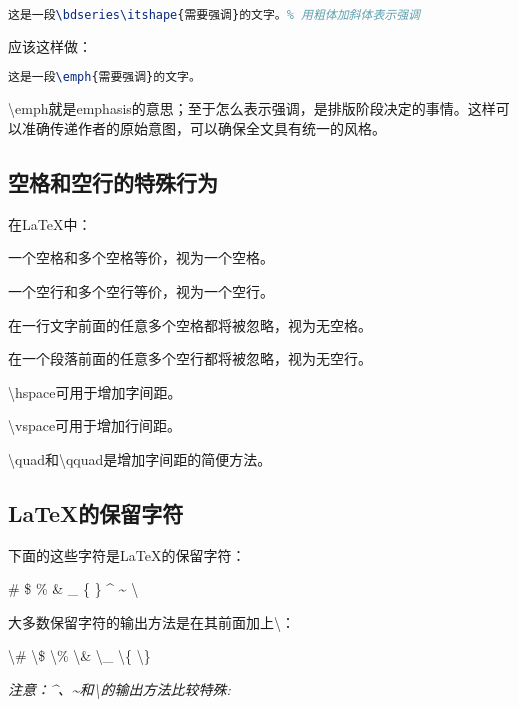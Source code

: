 \begin{lstlisting}[language=TeX]
这是一段\bdseries\itshape{需要强调}的文字。% 用粗体加斜体表示强调
\end{lstlisting}

应该这样做：

\begin{lstlisting}[language=TeX]
这是一段\emph{需要强调}的文字。
\end{lstlisting}

\textbackslash{}emph就是emphasis的意思；至于怎么表示强调，是排版阶段决定的事情。这样可以准确传递作者的原始意图，可以确保全文具有统一的风格。

\subsection{空格和空行的特殊行为}

在\LaTeX{}中：

\begin{Itemize}
\item {一个空格和多个空格等价，视为一个空格。}
\item {一个空行和多个空行等价，视为一个空行。}
\item {在一行文字前面的任意多个空格都将被忽略，视为无空格。}
\item {在一个段落前面的任意多个空行都将被忽略，视为无空行。}
\item {\textbackslash{}hspace可用于增加字间距。}
\item {\textbackslash{}vspace可用于增加行间距。}
\item {\textbackslash{}quad和\textbackslash{}qquad是增加字间距的简便方法。}
\end{Itemize}

\subsection{\LaTeX{}的保留字符}

下面的这些字符是\LaTeX{}的保留字符：

\# \qquad \$ \qquad \% \qquad \& \qquad \_ \qquad \{ \qquad \} \qquad \textasciicircum{} \qquad \textasciitilde{} \qquad \textbackslash{}

大多数保留字符的输出方法是在其前面加上\textbackslash{}：

\textbackslash{}\# \qquad \textbackslash{}\$ \qquad \textbackslash{}\% \qquad \textbackslash{}\& \qquad \textbackslash{}\_ \qquad \textbackslash{}\{ \qquad \textbackslash{}\}

\emph{注意：\textasciicircum{}、\textasciitilde{}和\textbackslash{}的输出方法比较特殊:}

